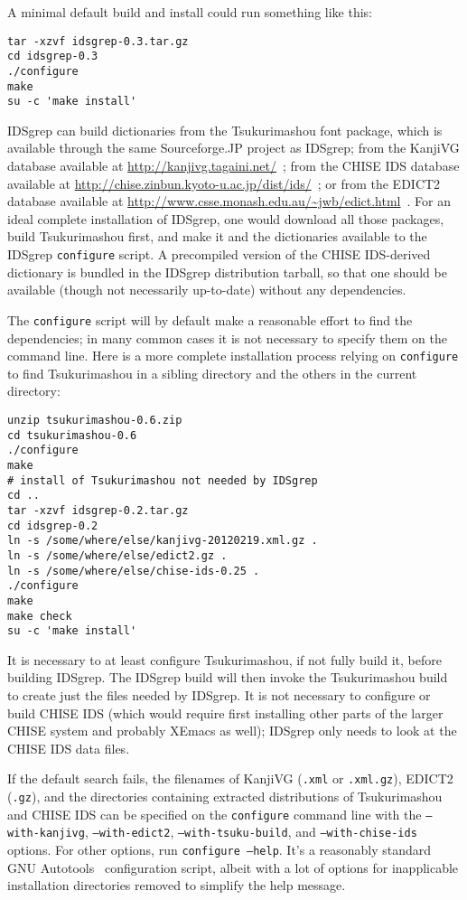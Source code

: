 \documentclass[twocolumn]{report}
\begin{document}
A minimal default build and install could run something like this:
\begin{verbatim}
tar -xzvf idsgrep-0.3.tar.gz
cd idsgrep-0.3
./configure
make
su -c 'make install'
\end{verbatim}

IDSgrep can build dictionaries
from the Tsukurimashou font package, which is available through the same
Sourceforge.JP project as IDSgrep; from the KanjiVG database available at
\url{http://kanjivg.tagaini.net/}~\cite{KanjiVG}; from the CHISE IDS
database available at
\url{http://chise.zinbun.kyoto-u.ac.jp/dist/ids/}~\cite{CHISE};
or from the EDICT2 database available at
\url{http://www.csse.monash.edu.au/~jwb/edict.html}~\cite{EDICT2}.  For an
ideal complete installation of IDSgrep, one would download all those
packages, build Tsukurimashou first, and make it and the dictionaries
available to the IDSgrep \texttt{configure} script.
A precompiled version of the CHISE IDS-derived dictionary is bundled
in the IDSgrep distribution tarball, so that one should be available (though
not necessarily up-to-date) without any dependencies.

The \texttt{configure}
script will by default make a reasonable effort to find the dependencies; in
many common cases it is not necessary to specify them on the command line. 
Here is a more complete installation process relying on \texttt{configure}
to find Tsukurimashou in a
sibling directory and the others in the current directory:
\begin{verbatim}
unzip tsukurimashou-0.6.zip
cd tsukurimashou-0.6
./configure
make
# install of Tsukurimashou not needed by IDSgrep
cd ..
tar -xzvf idsgrep-0.2.tar.gz
cd idsgrep-0.2
ln -s /some/where/else/kanjivg-20120219.xml.gz .
ln -s /some/where/else/edict2.gz .
ln -s /some/where/else/chise-ids-0.25 .
./configure
make
make check
su -c 'make install'
\end{verbatim}

It is necessary to at least configure Tsukurimashou, if not fully build it,
before building IDSgrep.  The IDSgrep build will then invoke the
Tsukurimashou build to create just the files needed by IDSgrep.  It is not
necessary to configure or build CHISE IDS (which would require first
installing other parts of the larger CHISE system and probably XEmacs as
well); IDSgrep only needs to look at the CHISE IDS data files.

If the default search fails, the filenames of KanjiVG (\texttt{.xml} or
\texttt{.xml.gz}), EDICT2 (\texttt{.gz}), and the directories containing
extracted distributions of Tsukurimashou and CHISE IDS can be
specified on the \texttt{configure} command line with
the \texttt{--with-kanjivg}, \texttt{--with-edict2},
\texttt{--with-tsuku-build}, and \texttt{--with-chise-ids} options.  For
other options, run \texttt{configure --help}.  It's a reasonably standard
GNU Autotools~\cite{Autotools} configuration script, albeit with a lot of
options for inapplicable installation directories removed to simplify the
help message.
\end{document}
